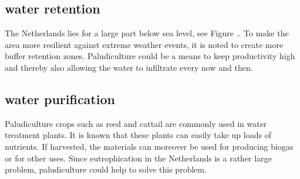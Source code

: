 \documentclass[a4paper,12pt]{scrbook}
\begin{document}
{\subsection{water retention}
The Netherlands lies for a large part below sea level, see Figure .. To make the area more resilient against extreme weather events, it is noted to create more buffer retention zones. Paludiculture could be a means to keep productivity high and thereby also allowing the water to infiltrate every now and then. 

\subsection{water purification}
Paludiculture crops such as reed and cattail are commonly used in water treatment plants. It is known that these plants can easily take up loads of nutrients. If harvested, the materials can moreover be used for producing biogas or for other uses. Since eutrophication in the Netherlands is a rather large problem, paludiculture could help to solve this problem.



}
\end{document}
